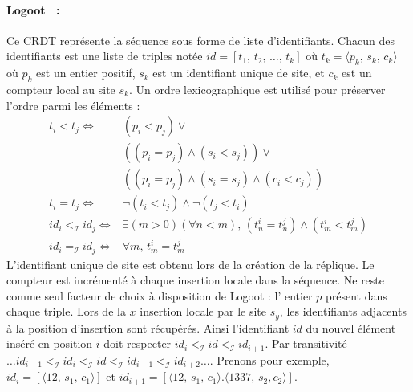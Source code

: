 
\paragraph{Logoot~\cite{weiss2010collaborative, weiss2009logoot,
    weiss2010logootundo} :} Ce CRDT représente la séquence sous forme de liste
d'identifiants. Chacun des identifiants est une liste de triples notée
$id = [t_1,\,t_2,\,\ldots,\,t_k]$ où $t_k=\langle p_k,\,s_k,\,c_k \rangle$ où
$p_k$ est un entier positif, $s_k$ est un identifiant unique de site, et $c_k$
est un compteur local au site $s_k$. Un ordre lexicographique est utilisé pour
préserver l'ordre parmi les éléments :
\begin{align*}
  t_i < t_j \iff & (p_i < p_j) \vee \\
                 & ((p_i = p_j) \wedge (s_i<s_j)) \vee \\
                 & ((p_i = p_j) \wedge (s_i = s_j) \wedge (c_i < c_j)) \\
  t_i = t_j \iff & \neg (t_i < t_j) \wedge \neg (t_j < t_i) \\
  id_i <_\mathcal{I} id_j \iff & \exists (m > 0)(\forall n < m),\, (t^i_n = t^j_n) \wedge (t^i_m < t^j_m) \\
  id_i =_\mathcal{I} id_j \iff & \forall m,\, t^i_m = t^j_m
\end{align*}
L'identifiant unique de site est obtenu lors de la création de la réplique. Le
compteur est incrémenté à chaque insertion locale dans la séquence. Ne reste
comme seul facteur de choix à disposition de Logoot : l' entier $p$ présent dans
chaque triple. Lors de la $x$ insertion locale par le site $s_y$, les
identifiants adjacents à la position d'insertion sont récupérés. Ainsi
l'identifiant $id$ du nouvel élément inséré en position $i$ doit respecter
$id_{i}<_\mathcal{I} id <_\mathcal{I} id_{i+1}$. Par transitivité
$\ldots id_{i-1} <_\mathcal{I} id_{i} <_\mathcal{I} id <_\mathcal{I} id_{i+1}
<_\mathcal{I} id_{i+2} \ldots$.
Prenons pour exemple, $id_{i}=[\langle 12,\,s_1,\,c_1\rangle]$ et
$id_{i+1}=[\langle 12,\, s_1,\,c_1\rangle.\langle 1337,\, s_2, c_2\rangle]$.
